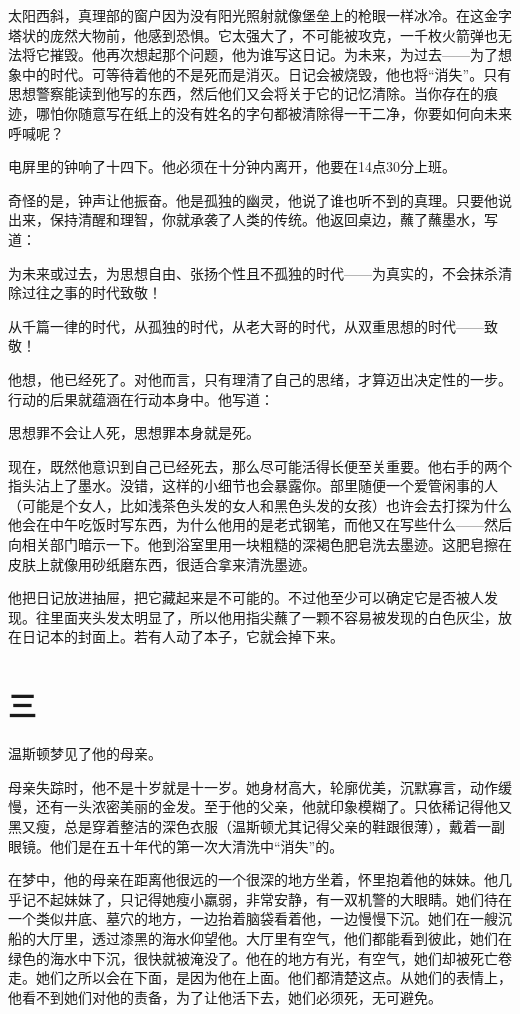 太阳西斜，真理部的窗户因为没有阳光照射就像堡垒上的枪眼一样冰冷。在这金字塔状的庞然大物前，他感到恐惧。它太强大了，不可能被攻克，一千枚火箭弹也无法将它摧毁。他再次想起那个问题，他为谁写这日记。为未来，为过去——为了想象中的时代。可等待着他的不是死而是消灭。日记会被烧毁，他也将``消失''。只有思想警察能读到他写的东西，然后他们又会将关于它的记忆清除。当你存在的痕迹，哪怕你随意写在纸上的没有姓名的字句都被清除得一干二净，你要如何向未来呼喊呢？

电屏里的钟响了十四下。他必须在十分钟内离开，他要在14点30分上班。

奇怪的是，钟声让他振奋。他是孤独的幽灵，他说了谁也听不到的真理。只要他说出来，保持清醒和理智，你就承袭了人类的传统。他返回桌边，蘸了蘸墨水，写道：

为未来或过去，为思想自由、张扬个性且不孤独的时代——为真实的，不会抹杀清除过往之事的时代致敬！

从千篇一律的时代，从孤独的时代，从老大哥的时代，从双重思想的时代——致敬！

他想，他已经死了。对他而言，只有理清了自己的思绪，才算迈出决定性的一步。行动的后果就蕴涵在行动本身中。他写道：

思想罪不会让人死，思想罪本身就是死。

现在，既然他意识到自己已经死去，那么尽可能活得长便至关重要。他右手的两个指头沾上了墨水。没错，这样的小细节也会暴露你。部里随便一个爱管闲事的人（可能是个女人，比如浅茶色头发的女人和黑色头发的女孩）也许会去打探为什么他会在中午吃饭时写东西，为什么他用的是老式钢笔，而他又在写些什么——然后向相关部门暗示一下。他到浴室里用一块粗糙的深褐色肥皂洗去墨迹。这肥皂擦在皮肤上就像用砂纸磨东西，很适合拿来清洗墨迹。

他把日记放进抽屉，把它藏起来是不可能的。不过他至少可以确定它是否被人发现。往里面夹头发太明显了，所以他用指尖蘸了一颗不容易被发现的白色灰尘，放在日记本的封面上。若有人动了本子，它就会掉下来。

\section*{三}\label{ux4e09}

温斯顿梦见了他的母亲。

母亲失踪时，他不是十岁就是十一岁。她身材高大，轮廓优美，沉默寡言，动作缓慢，还有一头浓密美丽的金发。至于他的父亲，他就印象模糊了。只依稀记得他又黑又瘦，总是穿着整洁的深色衣服（温斯顿尤其记得父亲的鞋跟很薄），戴着一副眼镜。他们是在五十年代的第一次大清洗中``消失''的。

在梦中，他的母亲在距离他很远的一个很深的地方坐着，怀里抱着他的妹妹。他几乎记不起妹妹了，只记得她瘦小羸弱，非常安静，有一双机警的大眼睛。她们待在一个类似井底、墓穴的地方，一边抬着脑袋看着他，一边慢慢下沉。她们在一艘沉船的大厅里，透过漆黑的海水仰望他。大厅里有空气，他们都能看到彼此，她们在绿色的海水中下沉，很快就被淹没了。他在的地方有光，有空气，她们却被死亡卷走。她们之所以会在下面，是因为他在上面。他们都清楚这点。从她们的表情上，他看不到她们对他的责备，为了让他活下去，她们必须死，无可避免。


